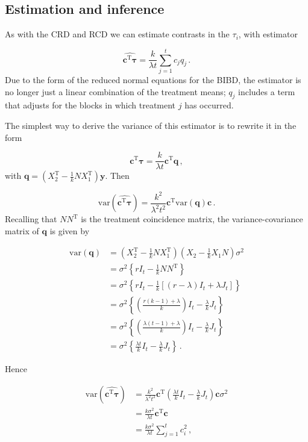 \documentclass[
]{book}
\theoremstyle{definition}
\theoremstyle{definition}
\theoremstyle{definition}
\theoremstyle{definition}
\theoremstyle{remark}
\begin{document}
\hypertarget{estimation-and-inference}{%
\subsection{Estimation and inference}\label{estimation-and-inference}}

As with the CRD and RCD we can estimate contrasts in the \(\tau_i\), with estimator

\[
\widehat{\boldsymbol{c}^{\mathrm{T}}\boldsymbol{\tau}} = \frac{k}{\lambda t}\sum_{j=1}^tc_jq_j\,.
\]
Due to the form of the reduced normal equations for the BIBD, the estimator is no longer just a linear combination of the treatment means; \(q_j\) includes a term that adjusts for the blocks in which treatment \(j\) has occurred.

The simplest way to derive the variance of this estimator is to rewrite it in the form

\[
\widehat{\boldsymbol{c}^{\mathrm{T}}\boldsymbol{\tau}} = \frac{k}{\lambda t}\boldsymbol{c}^{\mathrm{T}}\boldsymbol{q}\,, 
\]
with \(\boldsymbol{q} = \left(X_2^{\mathrm{T}} - \frac{1}{k}NX_1^{\mathrm{T}}\right)\boldsymbol{y}\). Then

\[
\mathrm{var}\left(\widehat{\boldsymbol{c}^{\mathrm{T}}\boldsymbol{\tau}}\right) = \frac{k^2}{\lambda^2t^2}\boldsymbol{c}^{\mathrm{T}}\mathrm{var}(\boldsymbol{q}) \boldsymbol{c}\,.
\]
Recalling that \(NN^{\mathrm{T}}\) is the treatment coincidence matrix, the variance-covariance matrix of \(\boldsymbol{q}\) is given by

\begin{align*}
\mathrm{var}(\boldsymbol{q}) & = \left(X_2^{\mathrm{T}} - \frac{1}{k}NX_1^{\mathrm{T}}\right)\left(X_2 - \frac{1}{k}X_1N\right)\sigma^2 \\
& = \sigma^2\left\{rI_t - \frac{1}{k}NN^{\mathrm{T}}\right\} \\
& = \sigma^2\left\{rI_t - \frac{1}{k}\left[(r-\lambda)I_t + \lambda J_t\right]\right\} \\
& = \sigma^2\left\{\left(\frac{r(k-1) + \lambda}{k}\right)I_t - \frac{\lambda}{k}J_t\right\} \\
& = \sigma^2\left\{\left(\frac{\lambda(t-1) + \lambda}{k}\right)I_t - \frac{\lambda}{k}J_t\right\} \\
& = \sigma^2\left\{\frac{\lambda t}{k}I_t - \frac{\lambda}{k}J_t\right\}\,.
\end{align*}

Hence

\begin{align*}
\mathrm{var}\left(\widehat{\boldsymbol{c}^{\mathrm{T}}\boldsymbol{\tau}}\right)
& = \frac{k^2}{\lambda^2t^2}\boldsymbol{c}^{\mathrm{T}}\left(\frac{\lambda t}{k}I_t - \frac{\lambda}{k}J_t\right)\boldsymbol{c}\sigma^2 \\
& = \frac{k\sigma^2}{\lambda t}\boldsymbol{c}^{\mathrm{T}}\boldsymbol{c} \\
& = \frac{k\sigma^2}{\lambda t}\sum_{j=1}^tc_i^2\,,
\end{align*}
\end{document}
